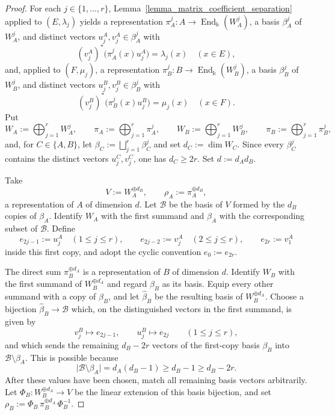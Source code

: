 \begin{proof}
    For each \(j\in\{1,\ldots,r\}\), Lemma~\ref{lemma_matrix_coefficient_separation} applied to \((E,\lambda_j)\) yields a representation \(\pi_A^j\colon A\to\operatorname{End}_{\Bbbk}(W_A^j)\), a basis \(\beta_A^j\) of \(W_A^j\), and distinct vectors \(u_j^A,v_j^A\in\beta_A^j\) with
    \[
        (v_j^A)^*\bigl(\pi_A^j(x)u_j^A\bigr)=\lambda_j(x)\quad(x\in E),
    \]
    and, applied to \((F,\mu_j)\), a representation \(\pi_B^j\colon B\to\operatorname{End}_{\Bbbk}(W_B^j)\), a basis \(\beta_B^j\) of \(W_B^j\), and distinct vectors \(u_j^B,v_j^B\in\beta_B^j\) with
    \[
        (v_j^B)^*\bigl(\pi_B^j(x)u_j^B\bigr)=\mu_j(x)\quad(x\in F).
    \]
    Put
    \[
        W_A:=\bigoplus_{j=1}^{r}W_A^j,\qquad \pi_A:=\bigoplus_{j=1}^{r}\pi_A^j,\qquad
        W_B:=\bigoplus_{j=1}^{r}W_B^j,\qquad \pi_B:=\bigoplus_{j=1}^{r}\pi_B^j,
    \]
    and, for \(C\in\{A,B\}\), let \(\beta_C:=\bigsqcup_{j=1}^{r}\beta_C^j\) and set \(d_C:=\dim W_C\). Since every \(\beta_C^j\) contains the distinct vectors \(u_j^C,v_j^C\), one has \(d_C\geq2r\). Set \(d:=d_Ad_B\).

    Take
    \[
        V:=W_A^{\oplus d_B},\qquad \rho_A:=\pi_A^{\oplus d_B},
    \]
    a representation of \(A\) of dimension \(d\). Let \(\mathcal{B}\) be the basis of \(V\) formed by the \(d_B\) copies of \(\beta_A\). Identify \(W_A\) with the first summand and \(\beta_A\) with the corresponding subset of \(\mathcal{B}\). Define
    \[
        e_{2j-1}:=u_j^A\quad(1\leq j\leq r),\qquad
        e_{2j-2}:=v_j^A\quad(2\leq j\leq r),\qquad
        e_{2r}:=v_1^A
    \]
    inside this first copy, and adopt the cyclic convention \(e_0:=e_{2r}\).

    The direct sum \(\pi_B^{\oplus d_A}\) is a representation of \(B\) of dimension \(d\). Identify \(W_B\) with the first summand of \(W_B^{\oplus d_A}\) and regard \(\beta_B\) as its basis. Equip every other summand with a copy of \(\beta_B\), and let \(\widehat{\beta}_B\) be the resulting basis of \(W_B^{\oplus d_A}\). Choose a bijection \(\widehat{\beta}_B\to\mathcal{B}\) which, on the distinguished vectors in the first summand, is given by
    \[
        v_j^B\longmapsto e_{2j-1},\qquad u_j^B\longmapsto e_{2j}\qquad(1\leq j\leq r),
    \]
    and which sends the remaining \(d_B-2r\) vectors of the first-copy basis \(\beta_B\) into \(\mathcal{B}\setminus\beta_A\). This is possible because
    \[
        \lvert\mathcal{B}\setminus\beta_A\rvert
        =d_A(d_B-1)\geq d_B-1\geq d_B-2r.
    \]
    After these values have been chosen, match all remaining basis vectors arbitrarily. Let \(\Phi_B\colon W_B^{\oplus d_A}\to V\) be the linear extension of this basis bijection, and set \(\rho_B:=\Phi_B\,\pi_B^{\oplus d_A}\,\Phi_B^{-1}\).


\end{proof}
